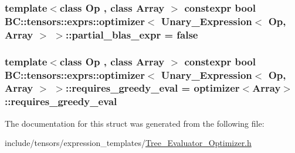 \subsubsection[{\texorpdfstring{partial\+\_\+blas\+\_\+expr}{partial_blas_expr}}]{\setlength{\rightskip}{0pt plus 5cm}template$<$class Op , class Array $>$ constexpr bool {\bf B\+C\+::tensors\+::exprs\+::optimizer}$<$ {\bf Unary\+\_\+\+Expression}$<$ Op, {\bf Array} $>$ $>$\+::partial\+\_\+blas\+\_\+expr = false\hspace{0.3cm}{\ttfamily [static]}}\hypertarget{structBC_1_1tensors_1_1exprs_1_1optimizer_3_01Unary__Expression_3_01Op_00_01Array_01_4_01_4_ad76e62b3cff6eec30950598ea588921d}{}\label{structBC_1_1tensors_1_1exprs_1_1optimizer_3_01Unary__Expression_3_01Op_00_01Array_01_4_01_4_ad76e62b3cff6eec30950598ea588921d}
\subsubsection[{\texorpdfstring{requires\+\_\+greedy\+\_\+eval}{requires_greedy_eval}}]{\setlength{\rightskip}{0pt plus 5cm}template$<$class Op , class Array $>$ constexpr bool {\bf B\+C\+::tensors\+::exprs\+::optimizer}$<$ {\bf Unary\+\_\+\+Expression}$<$ Op, {\bf Array} $>$ $>$\+::requires\+\_\+greedy\+\_\+eval = {\bf optimizer}$<${\bf Array}$>$\+::requires\+\_\+greedy\+\_\+eval\hspace{0.3cm}{\ttfamily [static]}}\hypertarget{structBC_1_1tensors_1_1exprs_1_1optimizer_3_01Unary__Expression_3_01Op_00_01Array_01_4_01_4_a1c767012af359a3fdd401f8e1a30e2e9}{}\label{structBC_1_1tensors_1_1exprs_1_1optimizer_3_01Unary__Expression_3_01Op_00_01Array_01_4_01_4_a1c767012af359a3fdd401f8e1a30e2e9}


The documentation for this struct was generated from the following file\+:\begin{DoxyCompactItemize}
\item 
include/tensors/expression\+\_\+templates/\hyperlink{Tree__Evaluator__Optimizer_8h}{Tree\+\_\+\+Evaluator\+\_\+\+Optimizer.\+h}\end{DoxyCompactItemize}
